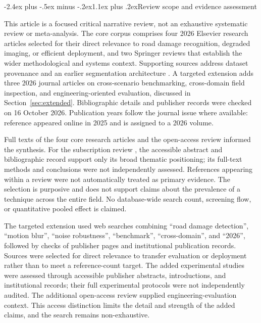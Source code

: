 \documentclass[11pt,a4paper]{article}
\makeatletter
\renewcommand\section{\@startsection{section}{1}{\z@}%
  {-2.4ex plus -.5ex minus -.2ex}{1.1ex plus .2ex}{\normalfont\large\bfseries}}
\makeatother
\begin{document}
\section{Review scope and evidence assessment}

This article is a focused critical narrative review, not an exhaustive systematic review or meta-analysis. The core corpus comprises four 2026 Elsevier research articles \cite{r3,r4,r5,r6} selected for their direct relevance to road damage recognition, degraded imaging, or efficient deployment, and two Springer reviews \cite{r1,r2} that establish the wider methodological and systems context. Supporting sources address dataset provenance and an earlier segmentation architecture \cite{r7,r8,r9}. A targeted extension adds three 2026 journal articles on cross-scenario benchmarking, cross-domain field inspection, and engineering-oriented evaluation, discussed in Section~\ref{sec:extended}. Bibliographic details and publisher records were checked on 16 October 2026. Publication years follow the journal issue where available: reference \cite{r2} appeared online in 2025 and is assigned to a 2026 volume.

Full texts of the four core research articles and the open-access review \cite{r1} informed the synthesis. For the subscription review \cite{r2}, the accessible abstract and bibliographic record support only its broad thematic positioning; its full-text methods and conclusions were not independently assessed. References appearing within a review were not automatically treated as primary evidence. The selection is purposive and does not support claims about the prevalence of a technique across the entire field. No database-wide search count, screening flow, or quantitative pooled effect is claimed.

The targeted extension used web searches combining ``road damage detection'', ``motion blur'', ``noise robustness'', ``benchmark'', ``cross-domain'', and ``2026'', followed by checks of publisher pages and institutional publication records. Sources were selected for direct relevance to transfer evaluation or deployment rather than to meet a reference-count target. The added experimental studies were assessed through accessible publisher abstracts, introductions, and institutional records; their full experimental protocols were not independently audited. The additional open-access review supplied engineering-evaluation context. This access distinction limits the detail and strength of the added claims, and the search remains non-exhaustive.
\end{document}
